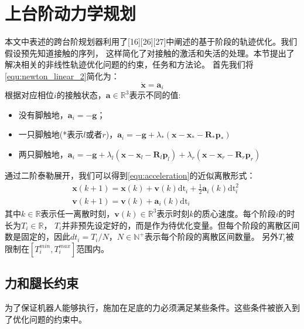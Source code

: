 \section{上台阶动力学规划}
本文中表述的跨台阶规划器利用了[16][26][27]中阐述的基于阶段的轨迹优化。我们假设预先知道接触的序列，
这样简化了对接触的激活和失活的处理。本节提出了解决相关的非线性轨迹优化问题的约束，任务和方法论。
首先我们将\autoref{equ:newton_linear_2}简化为：
\begin{equation}
    \label{equ:acceleration}
    \ddot{\boldsymbol{x}} = \boldsymbol{a}_i
\end{equation}
根据对应相位$i$的接触状态，$\boldsymbol{a} \in \mathbb{R}^{3}$表示不同的值:
\begin{itemize}
    \item 没有脚触地，$\boldsymbol{a}_i = -\boldsymbol{g}$；
    \item 一只脚触地(*表示$l$或者$r$)，$\boldsymbol{a}_i=-\boldsymbol{g}+\lambda_*\left(\boldsymbol{x}-\boldsymbol{x}_*-\boldsymbol{R}_* \boldsymbol{p}_*\right)$
    \item 两只脚触地，$\boldsymbol{a}_i=-\boldsymbol{g}+\lambda_l\left(\boldsymbol{x}-\boldsymbol{x}_l-\boldsymbol{R}_l \boldsymbol{p}_l\right)
                    +\lambda_r\left(\boldsymbol{x}-\boldsymbol{x}_r-\boldsymbol{R}_r \boldsymbol{p}_r\right)$
\end{itemize}
通过二阶泰勒展开，我们可以得到\autoref{equ:acceleration}的近似离散形式：
\begin{equation}
    \label{equ:approx_acc}
    \begin{aligned}
        & \boldsymbol{x}(k+1)=\boldsymbol{x}(k)+\boldsymbol{v}(k) \mathrm{dt}_i+\frac{1}{2} \boldsymbol{a}_i(k) \mathrm{dt}_i^2 \\
        & \boldsymbol{v}(k+1)=\boldsymbol{v}(k)+\boldsymbol{a}_i(k) \mathrm{dt}_i
        \end{aligned}
\end{equation}
其中$k \in \mathbb{R}$表示任一离散时刻，$\boldsymbol{v}(k) \in \mathbb{R}^{3}$表示时刻$k$的质心速度。每个阶段$i$的时长为$T_i \in \mathbb{R}$，
$T_i$并非预先设定好的，而是作为待优化变量。但每个阶段的离散区间数是固定的，因此$dt_i=T_i/N$，$N\in \mathbb{N}^+$表示每个阶段的离散区间数量。
另外$T_i$被限制在$[T_i^{min}, T_i^{max}]$范围内。

\subsection{力和腿长约束}
\label{constraints}
为了保证机器人能够执行，施加在足底的力必须满足某些条件。这些条件被嵌入到了优化问题的约束中。

